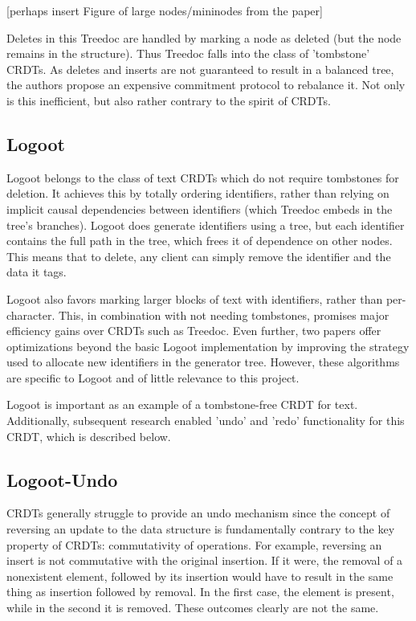 \documentclass[12pt,a4paper,twoside,openright]{report}
\begin{document}
[perhaps insert Figure of large nodes/mininodes from the paper]

Deletes in this Treedoc are handled by marking a node as deleted (but the node remains in the structure). Thus Treedoc falls into the class of 'tombstone' CRDTs. As deletes and inserts are not guaranteed to result in a balanced tree, the authors propose an expensive commitment protocol to rebalance it. Not only is this inefficient, but also rather contrary to the spirit of CRDTs.

\subsection{Logoot}

Logoot \cite{weiss2008} belongs to the class of text CRDTs which do not require tombstones for deletion. It achieves this by totally ordering identifiers, rather than relying on implicit causal dependencies between identifiers (which Treedoc embeds in the tree's branches). Logoot does generate identifiers using a tree, but each identifier contains the full path in the tree, which frees it of dependence on other nodes. This means that to delete, any client can simply remove the identifier and the data it tags.

Logoot also favors marking larger blocks of text with identifiers, rather than per-character. This, in combination with not needing tombstones, promises major efficiency gains over CRDTs such as Treedoc. Even further, two papers \cite{nedelec2013lseq} \cite{nedelec2013} offer optimizations beyond the basic Logoot implementation by improving the strategy used to allocate new identifiers in the generator tree. However, these algorithms are specific to Logoot and of little relevance to this project.

Logoot is important as an example of a tombstone-free CRDT for text. Additionally, subsequent research enabled 'undo' and 'redo' functionality for this CRDT, which is described below.


\subsection{Logoot-Undo}

CRDTs generally struggle to provide an undo mechanism since the concept of reversing an update to the data structure is fundamentally contrary to the key property of CRDTs: commutativity of operations. For example, reversing an insert is not commutative with the original insertion. If it were, the removal of a nonexistent element, followed by its insertion would have to result in the same thing as insertion followed by removal. In the first case, the element is present, while in the second it is removed. These outcomes clearly are not the same.
\end{document}
